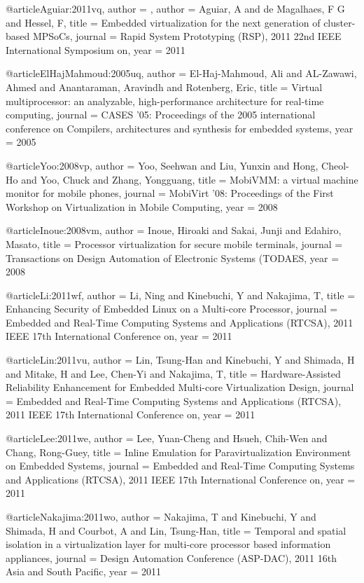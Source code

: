 
@article{Aguiar:2011vq,
author = {},
author = {Aguiar, A and de Magalhaes, F G and Hessel, F},
title = {{Embedded virtualization for the next generation of cluster-based MPSoCs}},
journal = {Rapid System Prototyping (RSP), 2011 22nd IEEE International Symposium on},
year = {2011}
}

@article{ElHajMahmoud:2005uq,
author = {El-Haj-Mahmoud, Ali and AL-Zawawi, Ahmed and Anantaraman, Aravindh and Rotenberg, Eric},
title = {{Virtual multiprocessor: an analyzable, high-performance architecture for real-time computing}},
journal = {CASES '05: Proceedings of the 2005 international conference on Compilers, architectures and synthesis for embedded systems},
year = {2005}
}

@article{Yoo:2008vp,
author = {Yoo, Seehwan and Liu, Yunxin and Hong, Cheol-Ho and Yoo, Chuck and Zhang, Yongguang},
title = {{MobiVMM: a virtual machine monitor for mobile phones}},
journal = {MobiVirt '08: Proceedings of the First Workshop on Virtualization in Mobile Computing},
year = {2008}
}

@article{Inoue:2008vm,
author = {Inoue, Hiroaki and Sakai, Junji and Edahiro, Masato},
title = {{Processor virtualization for secure mobile terminals}},
journal = {Transactions on Design Automation of Electronic Systems (TODAES},
year = {2008}
}

@article{Li:2011wf,
author = {Li, Ning and Kinebuchi, Y and Nakajima, T},
title = {{Enhancing Security of Embedded Linux on a Multi-core Processor}},
journal = {Embedded and Real-Time Computing Systems and Applications (RTCSA), 2011 IEEE 17th International Conference on},
year = {2011}
}

@article{Lin:2011vu,
author = {Lin, Tsung-Han and Kinebuchi, Y and Shimada, H and Mitake, H and Lee, Chen-Yi and Nakajima, T},
title = {{Hardware-Assisted Reliability Enhancement for Embedded Multi-core Virtualization Design}},
journal = {Embedded and Real-Time Computing Systems and Applications (RTCSA), 2011 IEEE 17th International Conference on},
year = {2011}
}

@article{Lee:2011we,
author = {Lee, Yuan-Cheng and Hsueh, Chih-Wen and Chang, Rong-Guey},
title = {{Inline Emulation for Paravirtualization Environment on Embedded Systems}},
journal = {Embedded and Real-Time Computing Systems and Applications (RTCSA), 2011 IEEE 17th International Conference on},
year = {2011}
}

@article{Nakajima:2011wo,
author = {Nakajima, T and Kinebuchi, Y and Shimada, H and Courbot, A and Lin, Tsung-Han},
title = {{Temporal and spatial isolation in a virtualization layer for multi-core processor based information appliances}},
journal = {Design Automation Conference (ASP-DAC), 2011 16th Asia and South Pacific},
year = {2011}
}

